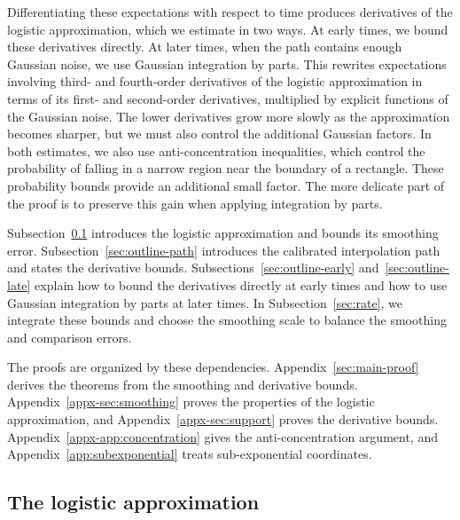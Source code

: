 \documentclass[11pt,letterpaper]{article}
\theoremstyle{remark}
\begin{document}
Differentiating these expectations with respect to time produces
derivatives of the logistic approximation, which we estimate in two
ways. At early times, we bound these derivatives directly. At later
times, when the path contains enough Gaussian noise, we use Gaussian
integration by parts. This rewrites expectations involving third- and
fourth-order derivatives of the logistic approximation in terms of its
first- and second-order derivatives, multiplied by explicit functions
of the Gaussian noise. The lower derivatives grow more slowly as the
approximation becomes sharper, but we must also control the additional
Gaussian factors. In both estimates, we also use anti-concentration
inequalities, which control the probability of falling in a narrow
region near the boundary of a rectangle. These probability bounds
provide an additional small factor. The more delicate part of the
proof is to preserve this gain when applying integration by parts.

Subsection~\ref{sec:outline-smoothing} introduces the logistic
approximation and bounds its smoothing error.
Subsection~\ref{sec:outline-path} introduces the calibrated
interpolation path and states the derivative bounds.
Subsections~\ref{sec:outline-early} and~\ref{sec:outline-late} explain
how to bound the derivatives directly at early times and how to use
Gaussian integration by parts at later times. In
Subsection~\ref{sec:rate}, we integrate these bounds and choose the
smoothing scale to balance the smoothing and comparison errors.

The proofs are organized by these dependencies. Appendix~\ref{sec:main-proof}
derives the theorems from the smoothing and derivative bounds.
Appendix~\ref{appx-sec:smoothing} proves the properties of the logistic
approximation, and Appendix~\ref{appx-sec:support} proves the derivative
bounds. Appendix~\ref{appx-app:concentration} gives the anti-concentration
argument, and Appendix~\ref{app:subexponential} treats sub-exponential
coordinates.

\subsection{\texorpdfstring{The logistic approximation}{The logistic approximation}}
\label{sec:outline-smoothing}
\end{document}
